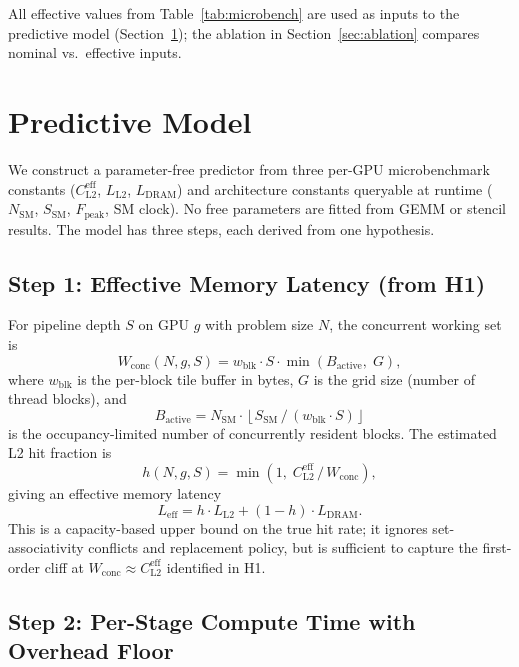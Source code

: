 \documentclass[10pt,twocolumn]{article}
\newcommand{\wconc}{W_{\text{conc}}}
\newcommand{\cleff}{C_{\text{L2}}^{\text{eff}}}
\newcommand{\Leff}{L_{\text{eff}}}
\newcommand{\LLtwo}{L_{\text{L2}}}
\newcommand{\Ldram}{L_{\text{DRAM}}}
\begin{document}
All effective values from Table~\ref{tab:microbench} are used as
inputs to the predictive model (Section~\ref{sec:model}); the
ablation in Section~\ref{sec:ablation} compares nominal vs.\
effective inputs.

\section{Predictive Model}
\label{sec:model}

We construct a parameter-free predictor from three per-GPU
microbenchmark constants ($\cleff$, $\LLtwo$, $\Ldram$) and
architecture constants queryable at runtime ($N_{\text{SM}}$,
$S_{\text{SM}}$, $F_{\text{peak}}$, SM clock).  No free parameters
are fitted from GEMM or stencil results.  The model has three
steps, each derived from one hypothesis.

\subsection{Step 1: Effective Memory Latency (from H1)}

For pipeline depth $S$ on GPU $g$ with problem size $N$, the
concurrent working set is
\begin{equation}
  \wconc(N, g, S) = w_{\text{blk}} \cdot S \cdot
  \min(B_{\text{active}}, \; G),
\end{equation}
where $w_{\text{blk}}$ is the per-block tile buffer in bytes, $G$
is the grid size (number of thread blocks), and
\[
  B_{\text{active}} = N_{\text{SM}} \cdot
  \left\lfloor S_{\text{SM}} \,/\, (w_{\text{blk}} \cdot S) \right\rfloor
\]
is the occupancy-limited number of concurrently resident blocks.
The estimated L2 hit fraction is
\begin{equation}
  h(N, g, S) = \min\!\left(1,\; \cleff \,/\, \wconc\right),
\end{equation}
giving an effective memory latency
\begin{equation}
  \Leff = h \cdot \LLtwo + (1 - h) \cdot \Ldram.
\end{equation}
This is a capacity-based upper bound on the true hit rate; it
ignores set-associativity conflicts and replacement policy, but is
sufficient to capture the first-order cliff at $\wconc \approx
\cleff$ identified in H1.

\subsection{Step 2: Per-Stage Compute Time with Overhead Floor}
\end{document}
